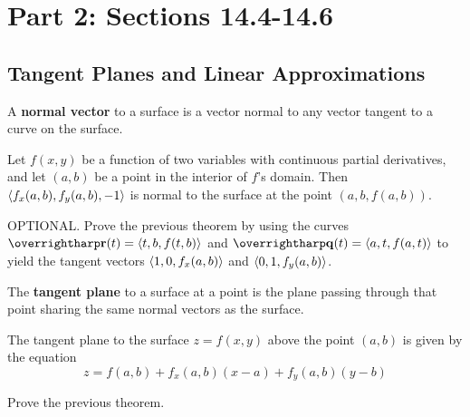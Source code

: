 \documentclass[letterpaper, twoside, 12pt]{book}
\begin{document}
\setcounter{chapter}{1}

\chapter{Part 2: Sections 14.4-14.6}

\setcounter{chapter}{14}
\setcounter{section}{3}

\section{Tangent Planes and Linear Approximations} %

\begin{definition}
  A \textbf{normal vector} to a surface is a vector normal to
  any vector tangent to a curve on the surface.
\end{definition}

\begin{theorem}
  Let $f(x,y)$ be a function of two variables with continuous partial
  derivatives, and let $(a,b)$ be a point in the interior of $f$'s
  domain. Then $\langle f_x(a,b),f_y(a,b),-1\rangle$ is normal to the surface
  at the point $(a,b,f(a,b))$.
\end{theorem}

          \begin{problem}
            OPTIONAL. Prove the previous theorem by using the curves
            $\vect{r}(t)=\<t,b,f(t,b)\>$ and
            $\vect{q}(t)=\<a,t,f(a,t)\>$ to yield the tangent vectors
            $\langle1,0,f_x(a,b)\rangle$ and $\langle0,1,f_y(a,b)\rangle$.
          \end{problem}

          \begin{solution}

          \end{solution}

\begin{definition}
  The \textbf{tangent plane} to a surface at a point is the plane passing
  through that point sharing the same normal vectors as the surface.
\end{definition}

\begin{theorem}
  The tangent plane to the surface $z=f(x,y)$ above the point $(a,b)$
  is given by the equation
    \[
      z = f(a,b) + f_x(a,b)(x-a)+f_y(a,b)(y-b)
    \]
\end{theorem}

          \begin{problem}
            Prove the previous theorem.
          \end{problem}
\end{document}
